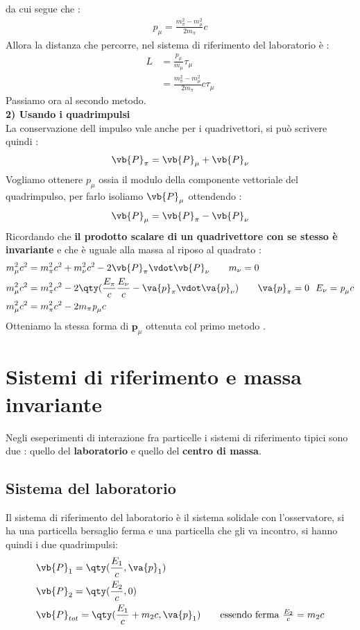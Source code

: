 \documentclass[a4paper, 12pt, twoside]{report}
\begin{document}
da cui segue che : 
\begin{align*}
        \textit{p}_{\mu} = \frac{m_{\pi}^2 - m_{\mu}^2}{2m_{\pi}}c
\end{align*}
Allora la distanza che percorre, nel sistema di riferimento del laboratorio è : 
\begin{align*}
        L &= \frac{\textit{p}_{\mu}}{m_{\mu}}\tau_{\mu}\\
          &= \frac{m_{\pi}^2 - m_{\mu}^2}{2m_{\pi}}c\tau_{\mu}
\end{align*}
Passiamo ora al secondo metodo. \\
\textbf{2) Usando i quadrimpulsi}\\
La conservazione dell impulso vale anche per i quadrivettori, si può scrivere quindi : 
\begin{align*}
    \vb{P}_{\pi} = \vb{P}_{\mu} + \vb{P}_{\nu}
\end{align*}
Vogliamo ottenere $\textit{p}_{\mu}$ ossia il modulo della componente vettoriale del quadrimpulso, per farlo 
isoliamo $\vb{P}_{\mu}$ ottendendo : 
\begin{align*}
    \vb{P}_{\mu} = \vb{P}_{\pi} - \vb{P}_{\nu}
\end{align*}
Ricordando che \textbf{il prodotto scalare di un quadrivettore con se stesso è invariante} e che è uguale alla massa al riposo 
al quadrato : 
\begin{align*}
        m_{\mu}^2c^2 &= m_{\pi}^2c^2 + m_{\nu}^2c^2 -2\vb{P}_{\pi}\vdot\vb{P}_{\nu}  \tag*{$m_{\nu} = 0$} \\
        m_{\mu}^2c^2 &= m_{\pi}^2c^2 -2\qty(\frac{E_{\pi}}{c} \frac{E_{\nu}}{c} - \va{p}_{\pi}\vdot\va{p}_{\nu}) \tag*{$\va{p}_{\pi} = 0$ \ $E_{\nu} = \textit{p}_{\mu}c$}\\
        m_{\mu}^2c^2 &= m_{\pi}^2c^2 -2m_{\pi}\textit{p}_{\mu}c 
\end{align*}
Otteniamo la stessa forma di $\textbf{p}_{\mu}$ ottenuta col primo metodo . 
\newpage
\chapter{Sistemi di riferimento e massa invariante}
Negli eseperimenti di interazione fra particelle i sistemi di riferimento tipici sono due : quello del \textbf{laboratorio} e quello del \textbf{centro di massa}.
\section{Sistema del laboratorio}
Il sistema di riferimento del laboratorio è il sistema solidale con l'osservatore, si ha una particella bersaglio ferma e una particella che gli va incontro, si hanno 
quindi i due quadrimpulsi: 
\begin{align*}
        &\vb{P}_1 = \qty(\frac{E_1}{c},\va{p}_1) \\
        &\vb{P}_2 = \qty(\frac{E_2}{c}, 0) \\
        &\vb{P}_{tot} = \qty(\frac{E_1}{c} + m_2c, \va{p}_1) \tag*{essendo ferma $ \frac{E_2}{c} = m_2c $}
\end{align*}
\end{document}

